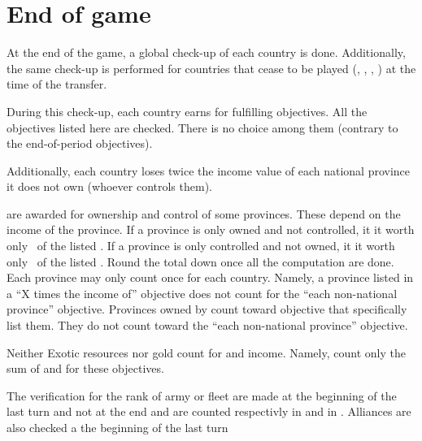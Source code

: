 

\section{End of game \VPs}\label{chVictories:End Game}
\aparag At the end of the game, a global check-up of each country is
done.
\bparag Additionally, the same check-up is performed for countries that
cease to be played (\POR, \HOL, \VEN, \POL) at the time of the transfer.

\aparag During this check-up, each country earns \VPs for fulfilling
objectives. All the objectives listed here are checked. There is no
choice among them (contrary to the end-of-period objectives).

\aparag Additionally, each country loses twice the income value of each
national province it does not own (whoever controls them).

\aparag[Provinces] \VPs are awarded for ownership and control of some
provinces. These \VPs depend on the income of the province.
\bparag If a province is only owned and not controlled, it it worth only
\td\ of the listed \VPs.
\bparag If a province is only controlled and not owned, it it worth only
\tu\ of the listed \VPs.
\bparag Round the \VPs total down once all the computation are done.
\bparag Each province may only count once for each country. Namely, a
province listed in a ``X times the income of'' objective does not count
for the ``each non-national province'' objective.
\bparag Provinces owned by \VASSAL count toward objective that
specifically list them. They do not count toward the ``each non-national
province'' objective.

\aparag Neither Exotic resources nor gold count for \COL and \TP
income. Namely, count only the sum of  and
 for these objectives.

\aparag The verification for the rank of army or fleet are made at the
beginning of the last turn and not at the end and are counted respectivly in
\LD and in \NWD.
\aparag Alliances are also checked a the beginning of the last turn

